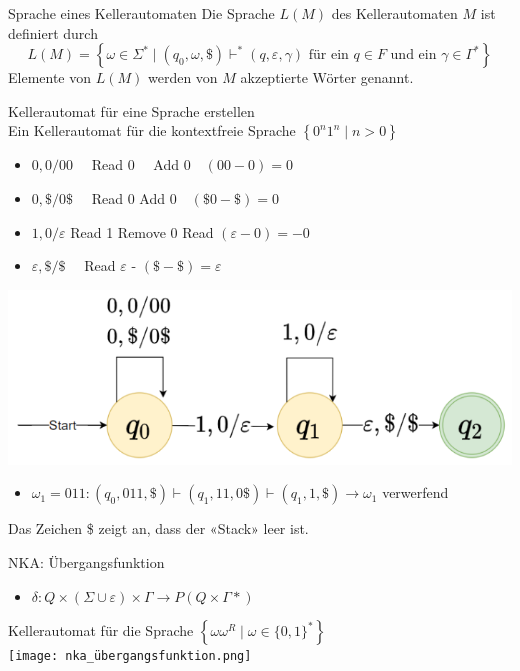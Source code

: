 \begin{definition}{Sprache eines Kellerautomaten}
    Die Sprache $L(M)$ des Kellerautomaten $M$ ist definiert durch
    $$
    L(M)=\left\{\omega \in \Sigma^{*} \mid\left(q_{0}, \omega, \$\right) \vdash^{*}(q, \varepsilon, \gamma) \text { für ein } q \in F \text { und ein } \gamma \in \Gamma^{*}\right\}
    $$
    Elemente von $L(M)$ werden von $M$ akzeptierte Wörter genannt.
\end{definition}

\begin{KR}{Kellerautomat für eine Sprache erstellen}\\
    Ein Kellerautomat für die kontextfreie Sprache $\left\{0^{n} 1^{n} \mid n>0\right\}$
    \begin{itemize}
    \item $0,0 / 00 \quad$ Read $0 \quad$ Add $0 \quad(00-0)=0$
    \item $0, \$ / 0 \$ \quad$ Read 0 Add $0 \quad(\$ 0-\$)=0$
    \item $1,0 / \varepsilon$ Read 1 Remove 0 Read $(\varepsilon-0)=-0$
    \item $\varepsilon, \$ / \$ \quad$ Read $\varepsilon$ - $(\$-\$)=\varepsilon$
    \end{itemize}
    \includegraphics[width=0.3\linewidth]{kellerautomat_sprache.png}
    \begin{itemize}
        \item $\omega_{1}=011:\left(q_{0}, 011, \$\right) \vdash\left(q_{1}, 11,0 \$\right) \vdash\left(q_{1}, 1, \$\right) \rightarrow \omega_{1}$ verwerfend
    \end{itemize}
    Das Zeichen \$ zeigt an, dass der «Stack» leer ist.
\end{KR}

\begin{concept}{NKA: Übergangsfunktion}
    \begin{itemize}
        \item $\delta: Q \times(\Sigma \cup \varepsilon) \times \Gamma \rightarrow P(Q \times \Gamma *)$
    \end{itemize}
    Kellerautomat für die Sprache $\left\{\omega \omega^{R} \mid \omega \in\{0,1\}^{*}\right\}$\\
    \texttt{[image: nka\_übergangsfunktion.png]}
\end{concept}